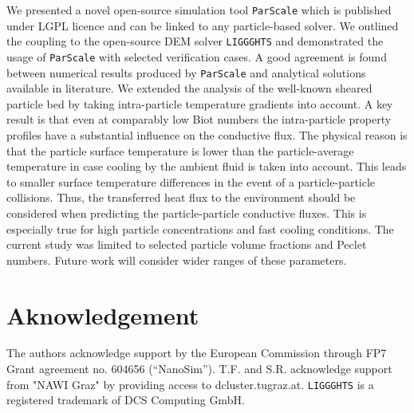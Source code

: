 \documentclass{particles2015}
\begin{document}
We presented a novel open-source simulation tool \texttt{ParScale} which is published under LGPL licence and can be linked to any particle-based solver. We outlined the coupling to the open-source DEM solver \texttt{LIGGGHTS}\textsuperscript{\textregistered} and demonstrated the usage of \texttt{ParScale} with selected verification cases. A good agreement is found between numerical results produced by \texttt{ParScale} and analytical solutions available in literature. We extended the analysis of the well-known sheared particle bed by taking intra-particle temperature gradients into account. A key result is that even at comparably low Biot numbers the intra-particle property profiles have a substantial influence on the conductive flux. The physical reason is that the particle surface temperature is lower than the particle-average temperature in case cooling by the ambient fluid is taken into account. This leads to smaller surface temperature differences in the event of a particle-particle collisions. Thus, the transferred heat flux to the environment should be considered when predicting the particle-particle conductive fluxes. This is especially true for high particle concentrations and fast cooling conditions. The current study was limited to selected particle volume fractions and Peclet numbers. Future work will consider wider ranges of these parameters. 

\section{Aknowledgement}
The authors acknowledge support by the European Commission through FP7 Grant agreement no. 604656 (“NanoSim”). T.F. and S.R. acknowledge support from "NAWI Graz" by providing access to dcluster.tugraz.at. \texttt{LIGGGHTS}\textsuperscript{\textregistered} is a registered trademark of DCS Computing GmbH.

\newpage

\end{document}
